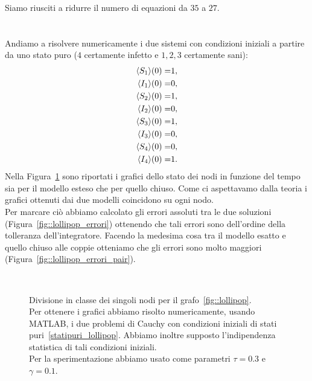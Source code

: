Siamo riusciti a ridurre il numero di equazioni da $35$ a $27$.\\ \\ \\
 Andiamo a risolvere numericamente i due sistemi con condizioni iniziali a partire da uno stato puro ($4$ certamente infetto e $1,2,3$ certamente sani):
\begingroup
\allowdisplaybreaks
\begin{equation}
\begin{aligned}
\langle S_1 \rangle(0) =& 1, \\
\langle I_1 \rangle(0) =& 0,\\
\langle S_2 \rangle(0) = &1, \\
\langle I_2 \rangle(0) = &0,\\
\langle S_3 \rangle(0) = &1, \\
\langle I_3 \rangle(0) = &0,\\
\langle S_4 \rangle(0) =& 0, \\
\langle I_4 \rangle(0) = &1.
\end{aligned}
\label{statipuri_lollipop}
\end{equation}
\endgroup
Nella Figura~\ref{fig::plot_lollipop} sono riportati i grafici dello stato dei nodi in funzione del tempo sia per il modello esteso che per quello chiuso. Come ci aspettavamo dalla teoria i grafici ottenuti dai due modelli coincidono su ogni nodo.\\
Per marcare ci\`o abbiamo calcolato gli errori assoluti tra le due soluzioni (Figura~\ref{fig::lollipop_errori}) ottenendo che tali errori sono dell'ordine della tolleranza dell'integratore. Facendo la medesima cosa tra il modello esatto e quello chiuso alle coppie otteniamo che gli errori sono molto maggiori (Figura~\ref{fig::lollipop_errori_pair}).

\begin{figure}
	\centering
\subfloat[][Nodo 1]{}
\subfloat[][Nodo 2]{}
\\
\subfloat[][Nodo 3]{}
\subfloat[][Nodo 4]{}

\caption[Sperimentazione in MATLAB relativo al grafo~\ref{fig::lollipop}]{Divisione in classe dei singoli nodi per il grafo~\ref{fig::lollipop}.\\
	Per ottenere i grafici abbiamo risolto numericamente, usando MATLAB, i due problemi di Cauchy con condizioni iniziali di stati puri~\eqref{statipuri_lollipop}. Abbiamo inoltre supposto l'indipendenza statistica di tali condizioni iniziali.\\
	Per la sperimentazione abbiamo usato come parametri $\tau = 0.3$ e $\gamma = 0.1$.}	\label{fig::plot_lollipop}
\end{figure}

